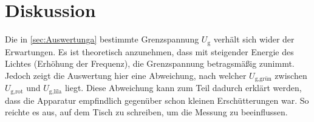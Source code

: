 \section{Diskussion}
\label{sec:Diskussion}

Die in \autoref{sec:Auswertunga} bestimmte Grenzspannung $U_{\text{g}}$ verhält sich wider der Erwartungen. Es ist theoretisch anzunehmen, dass mit steigender Energie des Lichtes (Erhöhung der Frequenz), die Grenzspannung betragsmäßig 
zunimmt. Jedoch zeigt die Auswertung hier eine Abweichung, nach welcher $U_{\text{g,grün}}$ zwischen $U_{\text{g,rot}}$ und $U_{\text{g,lila}}$ liegt. 
Diese Abweichung kann zum Teil dadurch erklärt werden, dass die Apparatur empfindlich gegenüber schon kleinen Erschütterungen war. So reichte es aus, auf dem Tisch zu schreiben, um die Messung zu beeinflussen.